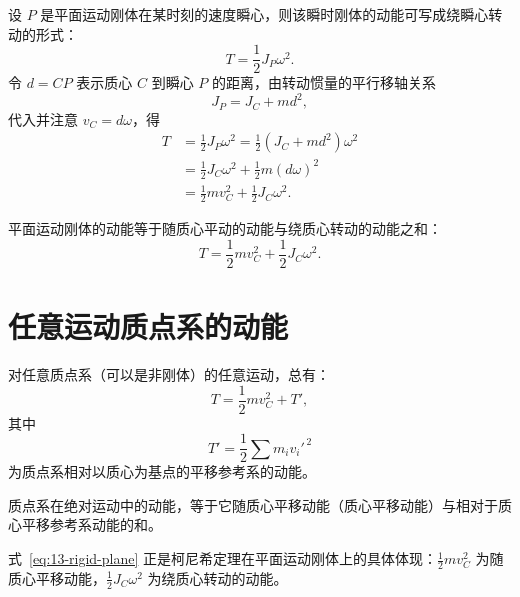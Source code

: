 设 $P$ 是平面运动刚体在某时刻的速度瞬心，则该瞬时刚体的动能可写成绕瞬心转动的形式：
\begin{equation}\label{eq:13-rigid-instant}
  T=\frac{1}{2}J_P\omega^2 .
\end{equation}
令 $d=CP$ 表示质心 $C$ 到瞬心 $P$ 的距离，由转动惯量的平行移轴关系
\begin{equation}\label{eq:13-rigid-parallel}
  J_P=J_C+md^2 ,
\end{equation}
代入并注意 $v_C=d\omega$，得
\begin{equation}\label{eq:13-rigid-plane}
\begin{aligned}
  T &=\frac{1}{2}J_P\omega^2=\frac{1}{2}\left(J_C+md^2\right)\omega^2\\
    &=\frac{1}{2}J_C\omega^2+\frac{1}{2}m(d\omega)^2\\
    &=\frac{1}{2}mv_C^2+\frac{1}{2}J_C\omega^2 .
\end{aligned}
\end{equation}

\begin{keybox}[平面运动刚体的动能]
平面运动刚体的动能等于随质心平动的动能与绕质心转动的动能之和：
\[
T=\frac{1}{2}mv_C^2+\frac{1}{2}J_C\omega^2 .
\]
\end{keybox}

\section{任意运动质点系的动能}

对任意质点系（可以是非刚体）的任意运动，总有：
\begin{equation}\label{eq:13-konig-T}
  T=\frac{1}{2}mv_C^2+T' ,
\end{equation}
其中
\begin{equation}\label{eq:13-konig-Tprime}
  T'=\frac{1}{2}\sum m_iv_i'^{\,2}
\end{equation}
为质点系相对以质心为基点的平移参考系的动能。

\begin{theorem}[柯尼希定理]
质点系在绝对运动中的动能，等于它随质心平移动能（质心平移动能）与相对于质心平移参考系动能的和。
\end{theorem}

\begin{tipbox}[与平面运动刚体动能的联系]
式~\eqref{eq:13-rigid-plane} 正是柯尼希定理在平面运动刚体上的具体体现：$\tfrac{1}{2}mv_C^2$ 为随质心平移动能，$\tfrac{1}{2}J_C\omega^2$ 为绕质心转动的动能。
\end{tipbox}

